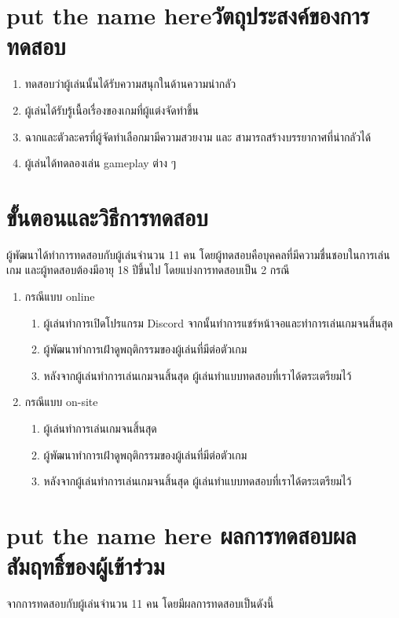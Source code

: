 \section{\ifenglish put the name here\else วัตถุประสงค์ของการทดสอบ\fi}
\begin{enumerate}
    \item ทดสอบว่าผู้เล่นนั้นได้รับความสนุกในด้านความน่ากลัว
    \item ผู้เล่นได้รับรู้เนื้อเรื่องของเกมที่ผู้แต่งจัดทำขึ้น
    \item ฉากและตัวละครที่ผู้จัดทำเลือกมามีความสวยงาม และ สามารถสร้างบรรยากาศที่น่ากลัวได้
    \item ผู้เล่นได้ทดลองเล่น gameplay ต่าง ๆ
\end{enumerate}

\section{ขั้นตอนและวิธีการทดสอบ}
ผู้พัฒนาได้ทำการทดสอบกับผู้เล่นจำนวน 11 คน โดยผู้ทดสอบคือบุคคลที่มีความชื่นชอบในการเล่นเกม และผู้ทดสอบต้องมีอายุ 18 ปีขึ้นไป โดยแบ่งการทดสอบเป็น 2 กรณี
\begin{enumerate}
    \item กรณีแบบ online
          \begin{enumerate}
              \item ผู้เล่นทำการเปิดโปรแกรม Discord จากนั้นทำการแชร์หน้าจอและทำการเล่นเกมจนสิ้นสุด
              \item ผู้พัฒนาทำการเฝ้าดูพฤติกรรมของผู้เล่นที่มีต่อตัวเกม
              \item หลังจากผู้เล่นทำการเล่นเกมจนสิ้นสุด ผู้เล่นทำแบบทดสอบที่เราได้ตระเตรียมไว้
          \end{enumerate}
    \item กรณีแบบ on-site
          \begin{enumerate}
              \item ผู้เล่นทำการเล่นเกมจนสิ้นสุด
              \item ผู้พัฒนาทำการเฝ้าดูพฤติกรรมของผู้เล่นที่มีต่อตัวเกม
              \item หลังจากผู้เล่นทำการเล่นเกมจนสิ้นสุด ผู้เล่นทำแบบทดสอบที่เราได้ตระเตรียมไว้
          \end{enumerate}
\end{enumerate}

\section{\ifenglish put the name here \else ผลการทดสอบผลสัมฤทธิ์ของผู้เข้าร่วม\fi}
จากการทดสอบกับผู้เล่นจำนวน 11 คน โดยมีผลการทดสอบเป็นดังนี้

